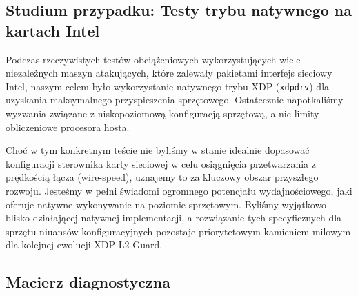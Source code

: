 \documentclass[11pt,a4paper]{article}
\begin{document}
\subsection{Studium przypadku: Testy trybu natywnego na kartach Intel}
Podczas rzeczywistych testów obciążeniowych wykorzystujących wiele niezależnych maszyn atakujących, które zalewały pakietami interfejs sieciowy Intel, naszym celem było wykorzystanie natywnego trybu XDP (\texttt{xdpdrv}) dla uzyskania maksymalnego przyspieszenia sprzętowego. Ostatecznie napotkaliśmy wyzwania związane z niskopoziomową konfiguracją sprzętową, a nie limity obliczeniowe procesora hosta.

Choć w tym konkretnym teście nie byliśmy w stanie idealnie dopasować konfiguracji sterownika karty sieciowej w celu osiągnięcia przetwarzania z prędkością łącza (wire-speed), uznajemy to za kluczowy obszar przyszłego rozwoju. Jesteśmy w pełni świadomi ogromnego potencjału wydajnościowego, jaki oferuje natywne wykonywanie na poziomie sprzętowym. Byliśmy wyjątkowo blisko działającej natywnej implementacji, a rozwiązanie tych specyficznych dla sprzętu niuansów konfiguracyjnych pozostaje priorytetowym kamieniem milowym dla kolejnej ewolucji XDP-L2-Guard.

\subsection{Macierz diagnostyczna}
\end{document}
